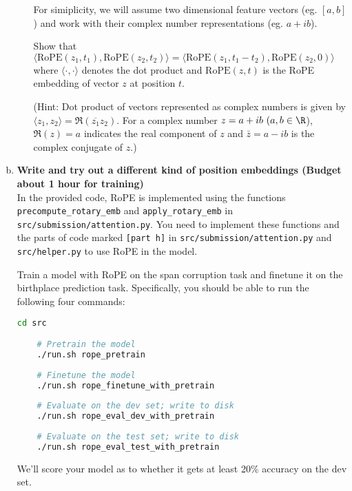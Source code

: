 \begin{enumerate}[(a)]
\begin{enumerate}[label=\roman*.]
For simiplicity, we will assume two dimensional feature vectors (eg. $[a, b]$) and work with their complex number representations (eg. $a + ib$).

Show that $\langle \text{RoPE}(z_1, t_1), \text{RoPE}(z_2, t_2) \rangle = \langle \text{RoPE}(z_1, t_1 - t_2), \text{RoPE}(z_2, 0) \rangle$ where $\langle \cdot, \cdot \rangle$ denotes the dot product and $\text{RoPE}(z, t)$ is the RoPE embedding of vector $z$ at position $t$.

(Hint: Dot product of vectors represented as complex numbers is given by $\langle z_1, z_2 \rangle = \Re(\overline{z_1} z_2)$. For a complex number $z = a + ib\ (a,b\in\R$), $\Re(z) = a$ indicates the real component of $z$ and $\bar{z} = a - ib$ is the complex conjugate of $z$.)

\end{enumerate}

\item {} \textbf{Write and try out a different kind of position embeddings (Budget about 1 hour for training)}\\

In the provided code, RoPE is implemented using the functions \texttt{precompute\_rotary\_emb} and \texttt{apply\_rotary\_emb} in \texttt{src/submission/attention.py}. You need to implement these functions and the parts of code marked \texttt{[part h]} in \texttt{src/submission/attention.py} and \texttt{src/helper.py} to use RoPE in the model.

Train a model with RoPE on the span corruption task and finetune it on the birthplace prediction task. Specifically, you should be able to run the following four commands:

\begin{lstlisting}[language=bash]
    cd src

    # Pretrain the model
    ./run.sh rope_pretrain
            
    # Finetune the model
    ./run.sh rope_finetune_with_pretrain
            
    # Evaluate on the dev set; write to disk
    ./run.sh rope_eval_dev_with_pretrain
            
    # Evaluate on the test set; write to disk
    ./run.sh rope_eval_test_with_pretrain
    \end{lstlisting}

We'll score your model as to whether it gets at least 20\% accuracy on the dev set.

\end{enumerate}


